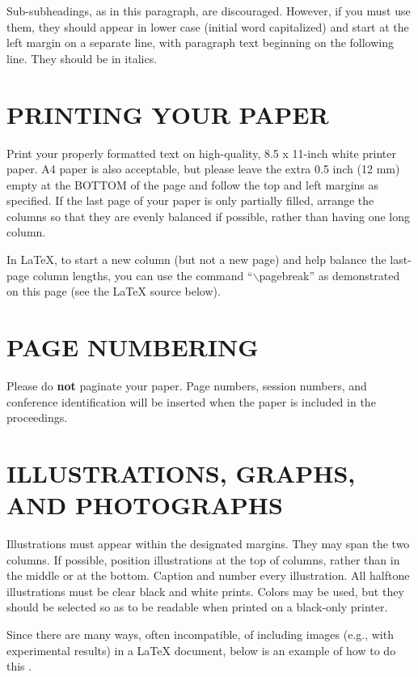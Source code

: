 \documentclass{article}
\begin{document}
Sub-subheadings, as in this paragraph, are discouraged. However, if you
must use them, they should appear in lower case (initial word
capitalized) and start at the left margin on a separate line, with paragraph
text beginning on the following line. They should be in italics.

\section{PRINTING YOUR PAPER}
\label{sec:print}

Print your properly formatted text on high-quality, 8.5 x 11-inch white printer
paper. A4 paper is also acceptable, but please leave the extra 0.5 inch (12 mm)
empty at the BOTTOM of the page and follow the top and left margins as
specified. If the last page of your paper is only partially filled, arrange
the columns so that they are evenly balanced if possible, rather than having
one long column.

In LaTeX, to start a new column (but not a new page) and help balance the
last-page column lengths, you can use the command ``$\backslash$pagebreak'' as
demonstrated on this page (see the LaTeX source below).

\section{PAGE NUMBERING}
\label{sec:page}

Please do {\bf not} paginate your paper. Page numbers, session numbers, and
conference identification will be inserted when the paper is included in the
proceedings.

\section{ILLUSTRATIONS, GRAPHS, AND PHOTOGRAPHS}
\label{sec:illust}

Illustrations must appear within the designated margins. They may span the two
columns. If possible, position illustrations at the top of columns, rather
than in the middle or at the bottom. Caption and number every illustration.
All halftone illustrations must be clear black and white prints. Colors may be
used, but they should be selected so as to be readable when printed on a
black-only printer.

Since there are many ways, often incompatible, of including images (e.g., with
experimental results) in a LaTeX document, below is an example of how to do
this \cite{Lamp86}.
\end{document}
